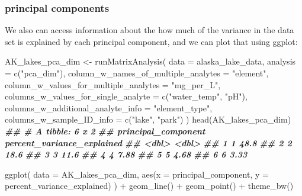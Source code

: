 \documentclass[
]{krantz}
\newenvironment{Shaded}{\begin{snugshade}}{\end{snugshade}}
\newcommand{\AttributeTok}[1]{\textcolor[rgb]{0.77,0.63,0.00}{#1}}
\newcommand{\DocumentationTok}[1]{\textcolor[rgb]{0.56,0.35,0.01}{\textbf{\textit{#1}}}}
\newcommand{\FunctionTok}[1]{\textcolor[rgb]{0.00,0.00,0.00}{#1}}
\newcommand{\NormalTok}[1]{#1}
\newcommand{\OtherTok}[1]{\textcolor[rgb]{0.56,0.35,0.01}{#1}}
\newcommand{\SpecialCharTok}[1]{\textcolor[rgb]{0.00,0.00,0.00}{#1}}
\newcommand{\StringTok}[1]{\textcolor[rgb]{0.31,0.60,0.02}{#1}}
\begin{document}
\hypertarget{principal-components}{%
\subsubsection{principal components}\label{principal-components}}

We also can access information about the how much of the variance in the data set is explained by each principal component, and we can plot that using ggplot:

\begin{Shaded}
\begin{Highlighting}[]
\NormalTok{AK\_lakes\_pca\_dim }\OtherTok{\textless{}{-}} \FunctionTok{runMatrixAnalysis}\NormalTok{(}
  \AttributeTok{data =}\NormalTok{ alaska\_lake\_data,}
  \AttributeTok{analysis =} \FunctionTok{c}\NormalTok{(}\StringTok{"pca\_dim"}\NormalTok{),}
  \AttributeTok{column\_w\_names\_of\_multiple\_analytes =} \StringTok{"element"}\NormalTok{,}
  \AttributeTok{column\_w\_values\_for\_multiple\_analytes =} \StringTok{"mg\_per\_L"}\NormalTok{,}
  \AttributeTok{columns\_w\_values\_for\_single\_analyte =} \FunctionTok{c}\NormalTok{(}\StringTok{"water\_temp"}\NormalTok{, }\StringTok{"pH"}\NormalTok{),}
  \AttributeTok{columns\_w\_additional\_analyte\_info =} \StringTok{"element\_type"}\NormalTok{,}
  \AttributeTok{columns\_w\_sample\_ID\_info =} \FunctionTok{c}\NormalTok{(}\StringTok{"lake"}\NormalTok{, }\StringTok{"park"}\NormalTok{)}
\NormalTok{)}
\FunctionTok{head}\NormalTok{(AK\_lakes\_pca\_dim)}
\DocumentationTok{\#\# \# A tibble: 6 x 2}
\DocumentationTok{\#\#   principal\_component percent\_variance\_explained}
\DocumentationTok{\#\#                 \textless{}dbl\textgreater{}                      \textless{}dbl\textgreater{}}
\DocumentationTok{\#\# 1                   1                      48.8 }
\DocumentationTok{\#\# 2                   2                      18.6 }
\DocumentationTok{\#\# 3                   3                      11.6 }
\DocumentationTok{\#\# 4                   4                       7.88}
\DocumentationTok{\#\# 5                   5                       4.68}
\DocumentationTok{\#\# 6                   6                       3.33}

\FunctionTok{ggplot}\NormalTok{(}
  \AttributeTok{data =}\NormalTok{ AK\_lakes\_pca\_dim, }
  \FunctionTok{aes}\NormalTok{(}\AttributeTok{x =}\NormalTok{ principal\_component, }\AttributeTok{y =}\NormalTok{ percent\_variance\_explained)}
\NormalTok{) }\SpecialCharTok{+}
  \FunctionTok{geom\_line}\NormalTok{() }\SpecialCharTok{+}
  \FunctionTok{geom\_point}\NormalTok{() }\SpecialCharTok{+}
  \FunctionTok{theme\_bw}\NormalTok{()}
\end{Highlighting}
\end{Shaded}
\end{document}
